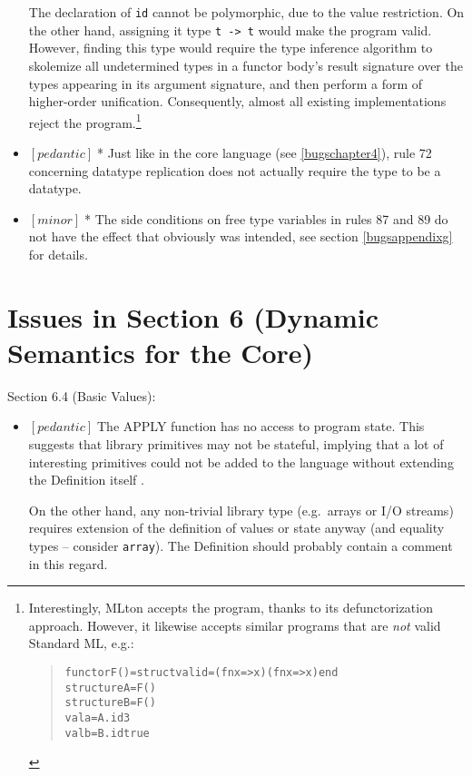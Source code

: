 \documentclass{article}
\newcommand{\m}[1]{$[\mathit{#1}]\;$}
\newcommand{\minor}{\m{minor}}
\newcommand{\pedantic}{\m{pedantic}}
\newcommand{\void}[1]{}
\begin{document}
\begin{itemize}
The declaration of {\tt id} cannot be polymorphic, due to the value restriction. On the other hand, assigning it type {\tt t -> t} would make the program valid. However,\void{ as Dreyer at al.\ note \cite{typeclasses},} finding this type would require the type inference algorithm to skolemize all undetermined types in a functor body's result signature over the types appearing in its argument signature, and then perform a form of higher-order unification. Consequently, almost all existing implementations reject the program.\footnote{Interestingly, MLton accepts the program, thanks to its defunctorization approach. However, it likewise accepts similar programs that are {\it not} valid Standard ML, e.g.:
\begin{quote}
\begin{alltt}
functor F() = struct val id = (fn x => x) (fn x => x) end\\
structure A = F()\\
structure B = F()\\
val a = A.id 3\\
val b = B.id true
\end{alltt}
\end{quote}
}

\item \pedantic * Just like in the core language (see \ref{bugschapter4}), rule 72 concerning datatype replication does not actually require the type to be a datatype.

\item \minor * The side conditions on free type variables in rules 87 and 89 do not have the effect that obviously was intended, see section \ref{bugsappendixg} for details.
\end{itemize}


\section{Issues in Section 6 (Dynamic Semantics for the Core)}
\label{bugschapter6}

Section 6.4 (Basic Values):
\nopagebreak

\begin{itemize}
\item \pedantic The APPLY function has no access to program state. This suggests that library primitives may not be stateful, implying that a lot of interesting primitives could not be added to the language without extending the Definition itself \cite{mistakes}.

On the other hand, any non-trivial library type (e.g.\ arrays or I/O streams) requires extension of the definition of values or state anyway (and equality types -- consider {\tt array}). The Definition should probably contain a comment in this regard.
\end{itemize}
\end{document}
